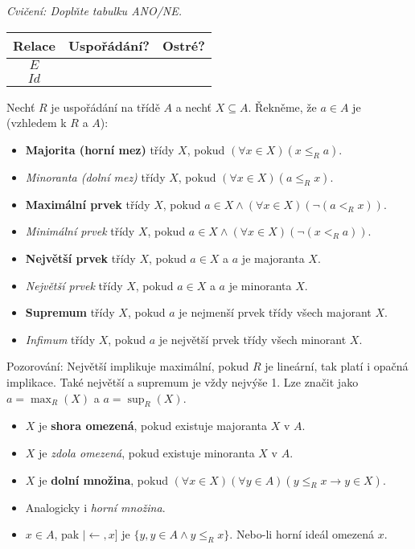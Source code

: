\textit{Cvičení: Doplňte tabulku ANO/NE.}

\begin{center}
	\begin{tabular}{c | c | c}
		\centering
		Relace & Uspořádání? & Ostré? \\ \hline
		$E$    &             &        \\
		$Id$   &             &
	\end{tabular}
\end{center}

\begin{definice}
	Nechť $R$ je uspořádání na třídě $A$ a nechť $X \subseteq A$. Řekněme, že $a \in A$ je (vzhledem k $R$ a $A$):
	
	\begin{itemize}
		\item \textbf{Majorita (horní mez)} třídy $X$, pokud $(\forall x \in X)(x \leq_{R} a)$.
		\item \textit{Minoranta (dolní mez)} třídy $X$, pokud $(\forall x \in X)(a \leq_{R} x)$.
		\item \textbf{Maximální prvek} třídy $X$, pokud $a \in X \land (\forall x \in X)(\neg (a <_{R} x))$.
		\item \textit{Minimální prvek} třídy $X$, pokud $a \in X \land (\forall x \in X)(\neg (x <_{R} a))$.
		\item \textbf{Největší prvek} třídy $X$, pokud $a \in X$ a $a$ je majoranta $X$.
		\item \textit{Největší prvek} třídy $X$, pokud $a \in X$ a $a$ je minoranta $X$.
		\item \textbf{Supremum} třídy $X$, pokud $a$ je nejmenší prvek třídy všech majorant $X$.
		\item \textit{Infimum} třídy $X$, pokud $a$ je největší prvek třídy všech minorant $X$.
	\end{itemize}
\end{definice}

Pozorování: Největší implikuje maximální, pokud $R$ je lineární, tak platí i opačná implikace. Také největší a supremum je vždy nejvýše 1. Lze značit jako $a = \max_{R}(X)$ a $a = \sup_{R}(X)$.

\begin{definice}
	\begin{itemize}
		\item $X$ je \textbf{shora omezená}, pokud existuje majoranta $X$ v $A$.
		\item $X$ je \textit{zdola omezená}, pokud existuje minoranta $X$ v $A$.
		\item $X$ je \textbf{dolní množina}, pokud $(\forall x \in X)(\forall y \in A)(y \leq_{R} x \rightarrow y \in X)$.
		\item Analogicky i \textit{horní množina}.
		\item $x \in A$, pak $| \leftarrow, x]$ je $\{y, y \in A \land y \leq_{R} x\}$. Nebo-li horní ideál omezená $x$.
	\end{itemize}
\end{definice}

